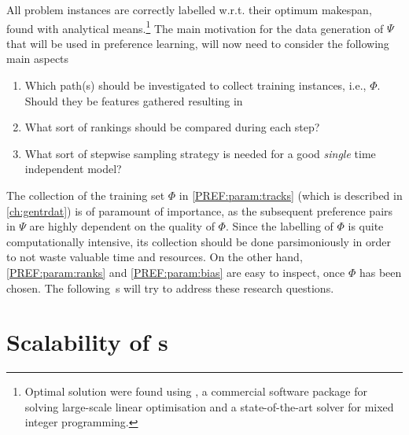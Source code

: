 All problem instances are correctly labelled w.r.t. their optimum makespan, 
found with analytical means.\footnote{Optimal solution were found using 
  \cite{gurobi}, a commercial software package for solving large-scale linear 
  optimisation and a state-of-the-art solver for mixed integer programming.} 
The main motivation for the data generation of $\Psi$ that will be used in 
preference learning, will now need to consider the following main aspects
\begin{enumerate}[after={{}}, leftmargin=*, label={\textbf{PREF.\arabic*}}, 
ref={{PREF.\arabic*}}]
    \item Which path(s) should be investigated to collect training instances, 
    i.e., $\Phi$. Should they be features gathered resulting in
    \label{PREF:param:tracks}
    \item What sort of rankings should be compared during each step?
    \label{PREF:param:ranks}
    \item What sort of stepwise sampling strategy is needed for a good
    \emph{single} time independent model?
    \label{PREF:param:bias}
\end{enumerate}
The collection of the training set $\Phi$ in \ref{PREF:param:tracks} (which is 
described in \cref{ch:gentrdat}) is of paramount of importance, as the 
subsequent preference pairs in $\Psi$ are highly dependent on the quality of 
$\Phi$. 
Since the labelling of $\Phi$ is quite computationally intensive, its 
collection should be done parsimoniously in order to not waste valuable time 
and resources. 
On the other hand, \ref{PREF:param:ranks} and \ref{PREF:param:bias} are 
easy to inspect, once $\Phi$ has been chosen.
The following s will try to address these 
research questions. 

\section{Scalability of \dr s}\label{sec:pref:scalability}

